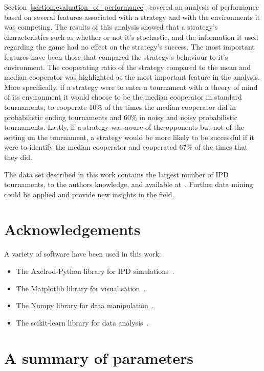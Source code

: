 \documentclass{article}
\begin{document}
Section~\ref{section:evaluation_of_performance}, covered an analysis of
performance based on several features associated with a strategy and with the
environments it was competing. The results of this analysis showed that a
strategy's characteristics such as whether or not it's stochastic, and the information it
used regarding the game had no effect on the strategy's success. The most
important features have been those that compared the strategy's behaviour to it's
environment. The cooperating ratio of the strategy compared to the mean and
median cooperator was highlighted as the most important feature in the analysis.
More specifically, if a strategy were to enter a tournament with a theory of
mind of its environment it would choose to be the median cooperator in standard
tournaments, to cooperate 10\% of the times the median cooperator did in probabilistic ending tournaments and 
60\% in noisy and noisy probabilistic
tournaments. Lastly, if a strategy was aware of the opponents but not of the
setting on the tournament, a strategy would be more likely to be successful if
it were to identify the median cooperator and cooperated 67\% of the times that
they did.

The data set described in this work contains the largest number of IPD tournaments,
to the authors knowledge, and available at~\cite{data}. Further data mining
could be applied and provide new insights in the field.




\section{Acknowledgements}

A variety of software have been used in this work:

\begin{itemize}
    \item The Axelrod-Python library for IPD simulations~\cite{axelrodproject}.
    \item The Matplotlib library for visualisation~\cite{hunter2007matplotlib}.
    \item The Numpy library for data manipulation~\cite{walt2011numpy}.
    \item The scikit-learn library for data analysis~\cite{scikit-learn}.
\end{itemize}

\appendix

\section{A summary of parameters}\label{app:parameters}
\end{document}
